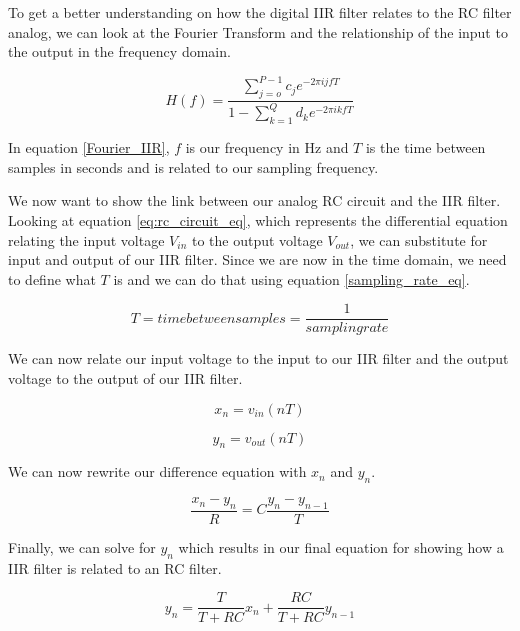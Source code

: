To get a better understanding on how the digital IIR filter relates to the RC filter analog, we can look at the Fourier Transform and the relationship of the input to the output in the frequency domain.

\begin{equation}\label{Fourier_IIR}
H(f)=\frac{\displaystyle\sum\limits_{j=o}^{P-1} c_je^{-2\pi ijfT}}{1-\displaystyle\sum\limits_{k=1}^{Q} d_ke^{-2\pi ikfT}}
\end{equation}

In equation \ref{Fourier_IIR}, $f$ is our frequency in Hz and $T$ is the time between samples in seconds and is related to our sampling frequency.

We now want to show the link between our analog RC circuit and the IIR filter.  Looking at equation \ref{eq:rc_circuit_eq}, which represents the differential equation relating the input voltage $V_{in}$ to the output voltage $V_{out}$, we can substitute for input and output of our IIR filter.  Since we are now in the time domain, we need to define what $T$ is and we can do that using equation \ref{sampling_rate_eq}.

\begin{equation}\label{sampling_rate_eq}
T=time between samples=\frac{1}{sampling rate}
\end{equation}

We can now relate our input voltage to the input to our IIR filter and the output voltage to the output of our IIR filter.

\begin{equation}\label{input_IIR}
x_n=v_{in}(nT)
\end{equation}

\begin{equation}\label{output_IIR}
y_n=v_{out}(nT)
\end{equation}

We can now rewrite our difference equation with $x_n$ and $y_n$.

\begin{equation}\label{diff_xn_yn}
\frac{x_n-y_n}{R}=C\frac{y_n-y_{n-1}}{T}
\end{equation}

Finally, we can solve for $y_n$ which results in our final equation for showing how a IIR filter is related to an RC filter.

\begin{equation}\label{final_IIR_RC}
y_n=\frac{T}{T+RC}x_n+\frac{RC}{T+RC}y_{n-1}
\end{equation}

